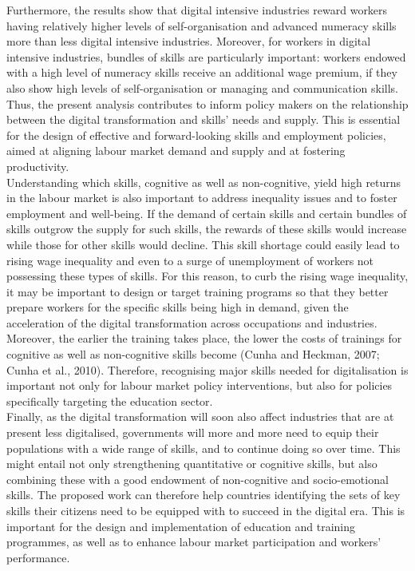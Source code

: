 Furthermore, the results show that digital intensive industries reward workers having relatively higher levels of self-organisation and advanced numeracy skills more than less digital intensive industries. Moreover, for workers in digital intensive industries, bundles of skills are particularly important: workers endowed with a high level of numeracy skills receive an additional wage premium, if they also show high levels of self-organisation or managing and communication skills. Thus, the present analysis contributes to inform policy makers on the relationship between the digital transformation and skills’ needs and supply. This is essential for the design of effective and forward-looking skills and employment policies, aimed at aligning labour market demand and supply and at fostering productivity.\\

Understanding which skills, cognitive as well as non-cognitive, yield high returns in the labour market is also important to address inequality issues and to foster employment and well-being. If the demand of certain skills and certain bundles of skills outgrow the supply for such skills, the rewards of these skills would increase while those for other skills would decline. This skill shortage could easily lead to rising wage inequality and even to a surge of unemployment of workers not possessing these types of skills. For this reason, to curb the rising wage inequality, it may be important to design or target training programs so that they better prepare workers for the specific skills being high in demand, given the acceleration of the digital transformation across occupations and industries. Moreover, the earlier the training takes place, the lower the costs of trainings for cognitive as well as non-cognitive skills become (Cunha and Heckman, 2007; Cunha et al., 2010). Therefore, recognising major skills needed for digitalisation is important not only for labour market policy interventions, but also for policies specifically targeting the education sector.\\

Finally, as the digital transformation will soon also affect industries that are at present less digitalised, governments will more and more need to equip their populations with a wide range of skills, and to continue doing so over time. This might entail not only strengthening quantitative or cognitive skills, but also combining these with a good endowment of non-cognitive and socio-emotional skills. The proposed work can therefore help countries identifying the sets of key skills their citizens need to be equipped with to succeed in the digital era. This is important for the design and implementation of education and training programmes, as well as to enhance labour market participation and workers’ performance.\\

